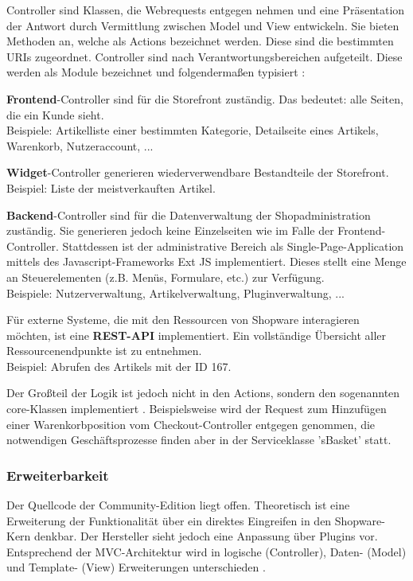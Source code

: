 \documentclass[12pt,a4paper,bibliography=totocnumbered,listof=totoc]{scrartcl}
\begin{document}
Controller sind Klassen, die Webrequests entgegen nehmen und eine Präsentation der Antwort durch Vermittlung zwischen Model und View entwickeln. Sie bieten Methoden an, welche als Actions bezeichnet werden. Diese sind die bestimmten URIs zugeordnet. Controller sind nach Verantwortungsbereichen aufgeteilt. Diese werden als Module bezeichnet und folgendermaßen typisiert \citep{shopware4Docs}:
\begin{compactitem}
\item \textbf{Frontend}-Controller sind für die Storefront zuständig. Das bedeutet: alle Seiten, die ein Kunde sieht.\\
Beispiele: Artikelliste einer bestimmten Kategorie, Detailseite eines Artikels, Warenkorb, Nutzeraccount, ...
\item \textbf{Widget}-Controller generieren wiederverwendbare Bestandteile der Storefront.\\
Beispiel: Liste der meistverkauften Artikel.
\item \textbf{Backend}-Controller sind für die Datenverwaltung der Shopadministration zuständig. Sie generieren jedoch keine Einzelseiten wie im Falle der Frontend-Controller. Stattdessen ist der administrative Bereich als Single-Page-Application mittels des Javascript-Frameworks Ext JS implementiert. Dieses stellt eine Menge an Steuerelementen (z.B. Menüs, Formulare, etc.) zur Verfügung.\\
Beispiele: Nutzerverwaltung, Artikelverwaltung, Pluginverwaltung, ...
\item Für externe Systeme, die mit den Ressourcen von Shopware interagieren möchten, ist eine \textbf{REST-API} implementiert. Ein vollständige Übersicht aller Ressourcenendpunkte ist \citep{shopwareRestApiEndpunkte} zu entnehmen.\\
Beispiel: Abrufen des Artikels mit der ID 167.
\end{compactitem}

Der Großteil der Logik ist jedoch nicht in den Actions, sondern den sogenannten core-Klassen implementiert \citep{shopware4Docs}. Beispielsweise wird der Request zum Hinzufügen einer Warenkorbposition vom Checkout-Controller entgegen genommen, die notwendigen Geschäftsprozesse finden aber in der Serviceklasse 'sBasket' statt.

\subsubsection{Erweiterbarkeit}
\label{subsubsection:shopwareErweiterbarkeit}
Der Quellcode der Community-Edition liegt offen. Theoretisch ist eine Erweiterung der Funktionalität über ein direktes Eingreifen in den Shopware-Kern denkbar. Der Hersteller sieht jedoch eine Anpassung über Plugins vor. Entsprechend der \ac{MVC}-Architektur wird in logische (Controller), Daten- (Model) und Template- (View) Erweiterungen unterschieden \citep{shopware5Docs}.
\end{document}
